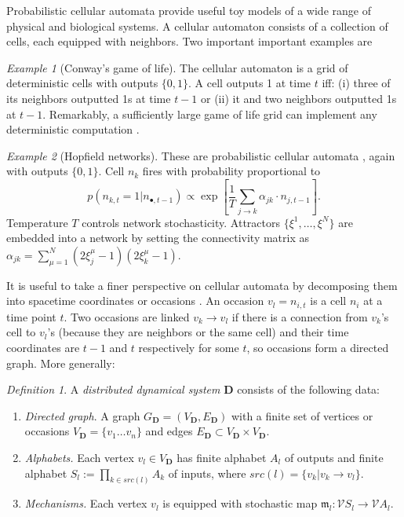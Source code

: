 \documentclass[12pt]{article}
\newcommand{\vecify}{{\mathcal V}}
\newcommand{\Act}{{A}}
\newcommand{\Sit}{{S}}
\newcommand{\occ}{{v}}
\newcommand{\univ}{{\mathbf D}}
\newcommand{\fm}{{\mathfrak m}}
\theoremstyle{remark}
\newtheorem{eg}{Example}
\newtheorem{defn}{Definition}
\begin{document}
Probabilistic cellular automata provide useful toy models of a 
wide range of physical and biological systems. A cellular 
automaton consists of a collection of cells, each equipped with 
neighbors. Two important important examples are

\begin{eg}[Conway's game of life]
    The cellular automaton is a grid of deterministic cells 
    with outputs $\{0,1\}$. A cell outputs 1 at time $t$ iff: 
    (i) three of its neighbors outputted 1s at time $t-1$ or 
    (ii) it and two neighbors outputted 1s at $t-1$. Remarkably,
    a sufficiently large game of life grid can implement any 
    deterministic computation \cite{berlekamp:82}. 
\end{eg}

\begin{eg}[Hopfield networks]
	These are probabilistic cellular automata \cite{hopfield:82, amit:89}, again with outputs $\{0,1\}$. Cell $n_k$ fires with probability proportional to 
\begin{equation*}
	p(n_{k,t}=1|n_{\bullet,t-1})\propto \exp\left[\frac{1}{T}
    \sum_{j\rightarrow k}\alpha_{j k}\cdot n_{j,{t-1}}\right].
\end{equation*}
Temperature $T$ controls network stochasticity. Attractors 
$\{\xi^1,\ldots,\xi^N\}$ are embedded into a network by setting 
the connectivity matrix as $\alpha_{j k}=\sum_{\mu=1}^N 
(2\xi_j^\mu-1)(2\xi_k^\mu-1)$.
\end{eg}

It is useful to take a finer perspective on cellular automata 
by decomposing them into spacetime coordinates or occasions 
\cite{balduzzi:11}. An occasion $\occ_l=n_{i,t}$ is a cell 
$n_i$ at a time point $t$. Two occasions are linked $\occ_k
\rightarrow \occ_l$ if there is a connection from $\occ_k$'s 
cell to $\occ_l$'s (because they are neighbors or the same cell)
and their time coordinates are $t-1$ and $t$ respectively for 
some $t$, so occasions form a directed graph. More generally:

\begin{defn}
	\label{d:fds}
	A \emph{distributed dynamical system} $\univ$ consists of 
    the following data:
\end{defn}

\begin{enumerate}[$\univ$1.]
	\item \emph{Directed graph}.
	A graph $G_\univ=(V_\univ,E_\univ)$ with a finite set of 
    vertices or occasions $V_\univ=\{\occ_1\ldots\occ_n\}$ and 
    edges $E_\univ\subset V_\univ\times V_\univ$.
	\item \emph{Alphabets.}
	Each vertex $\occ_l\in V_\univ$ has finite alphabet 
    $\Act_l$ of outputs and finite alphabet $\Sit_l:=
    \prod_{k\in src(l)}A_k$ of inputs, where $src(l)=
    \{\occ_k|\occ_k\rightarrow \occ_l\}$.
	\item \emph{Mechanisms.}
	Each vertex $\occ_l$ is equipped with stochastic map 
    $\fm_l:\vecify\Sit_l\rightarrow \vecify\Act_l$.
\end{enumerate}
\end{document}
